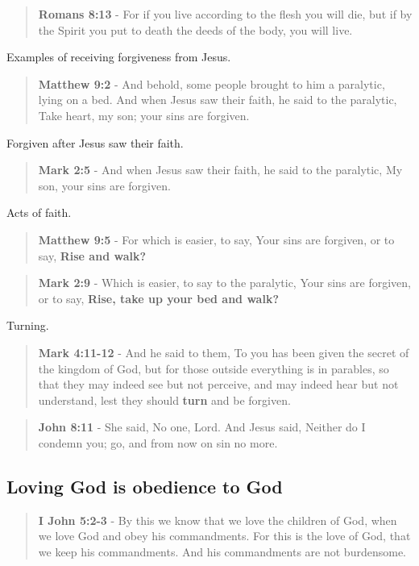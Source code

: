 \documentclass[11pt]{article}
\begin{document}
\begin{quote}
\textbf{Romans 8:13} - For if you live according to the flesh you will die, but if by the Spirit you put to death the deeds of the body, you will live.
\end{quote}

Examples of receiving forgiveness from Jesus.

\begin{quote}
\textbf{Matthew 9:2} - And behold, some people brought to him a paralytic, lying on a bed. And when Jesus saw their faith, he said to the paralytic, Take heart, my son; your sins are forgiven.
\end{quote}

Forgiven after Jesus saw their faith.

\begin{quote}
\textbf{Mark 2:5} - And when Jesus saw their faith, he said to the paralytic, My son, your sins are forgiven.
\end{quote}

Acts of faith.

\begin{quote}
\textbf{Matthew 9:5} - For which is easier, to say, Your sins are forgiven, or to say, \textbf{Rise and walk?}
\end{quote}

\begin{quote}
\textbf{Mark 2:9} - Which is easier, to say to the paralytic, Your sins are forgiven, or to say, \textbf{Rise, take up your bed and walk?}
\end{quote}

Turning.

\begin{quote}
\textbf{Mark 4:11-12} - And he said to them, To you has been given the secret of the kingdom of God, but for those outside everything is in parables, so that they may indeed see but not perceive, and may indeed hear but not understand, lest they should \textbf{turn} and be forgiven.
\end{quote}

\begin{quote}
\textbf{John 8:11} - She said, No one, Lord. And Jesus said, Neither do I condemn you; go, and from now on sin no more.
\end{quote}

\subsection{Loving God is obedience to God}
\label{sec:orgdddd4fa}
\begin{quote}
\textbf{I John 5:2-3} - By this we know that we love the children of God, when we love God and obey his commandments. For this is the love of God, that we keep his commandments. And his commandments are not burdensome.
\end{quote}
\end{document}
